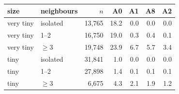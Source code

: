 \begin{tabular}{llrrrrr}
\toprule
size & neighbours & $n$ & A0 & A1 & A8 & A2 \\
\midrule
very tiny & isolated & 13{,}765 & 18.2 & 0.0 & 0.0 & 0.0 \\
very tiny & 1--2 & 16{,}750 & 19.0 & 0.3 & 0.4 & 0.1 \\
very tiny & $\geq$3 & 19{,}748 & 23.9 & 6.7 & 5.7 & 3.4 \\
tiny & isolated & 31{,}841 & 1.0 & 0.0 & 0.0 & 0.0 \\
tiny & 1--2 & 27{,}898 & 1.4 & 0.1 & 0.1 & 0.1 \\
tiny & $\geq$3 & 6{,}675 & 4.3 & 2.1 & 1.9 & 1.2 \\
\bottomrule
\end{tabular}
